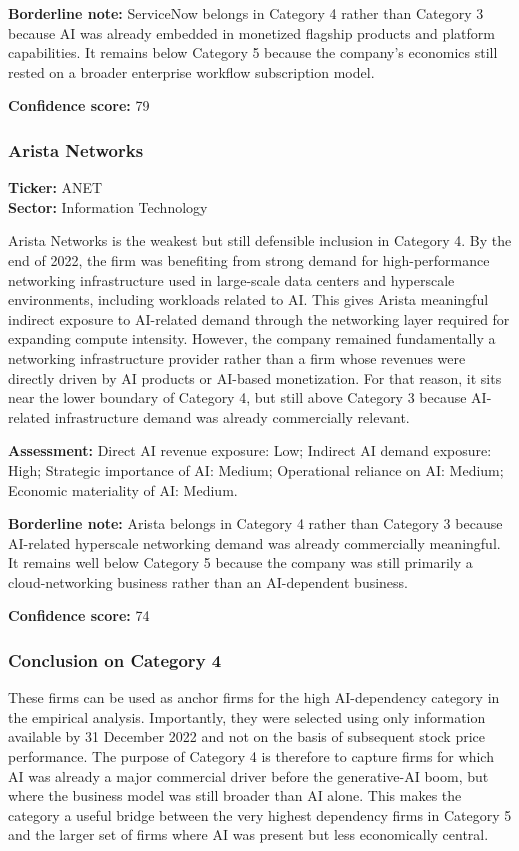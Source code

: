 \documentclass{article}
\begin{document}
\textbf{Borderline note:} ServiceNow belongs in Category 4 rather than Category 3 because AI was already embedded in monetized flagship products and platform capabilities. It remains below Category 5 because the company’s economics still rested on a broader enterprise workflow subscription model.

\textbf{Confidence score:} 79

\subsubsection*{Arista Networks}
\textbf{Ticker:} ANET \\
\textbf{Sector:} Information Technology

Arista Networks is the weakest but still defensible inclusion in Category 4. By the end of 2022, the firm was benefiting from strong demand for high-performance networking infrastructure used in large-scale data centers and hyperscale environments, including workloads related to AI. This gives Arista meaningful indirect exposure to AI-related demand through the networking layer required for expanding compute intensity. However, the company remained fundamentally a networking infrastructure provider rather than a firm whose revenues were directly driven by AI products or AI-based monetization. For that reason, it sits near the lower boundary of Category 4, but still above Category 3 because AI-related infrastructure demand was already commercially relevant.

\textbf{Assessment:} Direct AI revenue exposure: Low; Indirect AI demand exposure: High; Strategic importance of AI: Medium; Operational reliance on AI: Medium; Economic materiality of AI: Medium.

\textbf{Borderline note:} Arista belongs in Category 4 rather than Category 3 because AI-related hyperscale networking demand was already commercially meaningful. It remains well below Category 5 because the company was still primarily a cloud-networking business rather than an AI-dependent business.

\textbf{Confidence score:} 74

\subsubsection*{Conclusion on Category 4}

These firms can be used as anchor firms for the high AI-dependency category in the empirical analysis. Importantly, they were selected using only information available by 31 December 2022 and not on the basis of subsequent stock price performance. The purpose of Category 4 is therefore to capture firms for which AI was already a major commercial driver before the generative-AI boom, but where the business model was still broader than AI alone. This makes the category a useful bridge between the very highest dependency firms in Category 5 and the larger set of firms where AI was present but less economically central.
\end{document}
